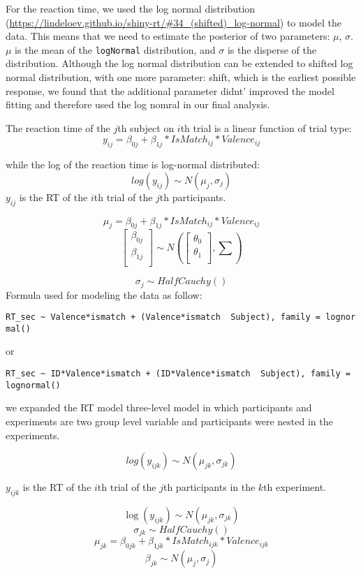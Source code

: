 \documentclass[
  man]{apa6}
\begin{document}
For the reaction time, we used the log normal distribution (\url{https://lindeloev.github.io/shiny-rt/\#34_(shifted)_log-normal}) to model the data. This means that we need to estimate the posterior of two parameters: \(\mu\), \(\sigma\). \(\mu\) is the mean of the \texttt{logNormal} distribution, and \(\sigma\) is the disperse of the distribution. Although the log normal distribution can be extended to shifted log normal distribution, with one more parameter: shift, which is the earliest possible response, we found that the additional parameter didnt' improved the model fitting and therefore used the log nomral in our final analysis.

The reaction time of the \(j\)th subject on \(i\)th trial is a linear function of trial type: \[y_{ij} = \beta_{0j} + \beta_{1j}*IsMatch_{ij} * Valence_{ij}\]

while the log of the reaction time is log-normal distributed:
\[ log(y_{ij}) \sim N(\mu_{j}, \sigma_{j})\]
\(y_{ij}\) is the RT of the \(i\)th trial of the \(j\)th participants.

\[\mu_{j} = \beta_{0j} + \beta_{1j}*IsMatch_{ij} * Valence_{ij}\]
\[ \begin{bmatrix}\beta_{0j}\\
\beta_{1j}\\
\end{bmatrix} \sim N(\begin{bmatrix}\theta_{0}\\
\theta_{1}\\
\end{bmatrix}, \sum) \]

\[\sigma_{j} \sim HalfCauchy()\]
Formula used for modeling the data as follow:

\texttt{RT\_sec\ \textasciitilde{}\ Valence*ismatch\ +\ (Valence*ismatch\ \textbar{}\ Subject),\ family\ =\ lognormal()}

or

\texttt{RT\_sec\ \textasciitilde{}\ ID*Valence*ismatch\ +\ (ID*Valence*ismatch\ \textbar{}\ Subject),\ family\ =\ lognormal()}

we expanded the RT model three-level model in which participants and experiments are two group level variable and participants were nested in the experiments.

\[ log(y_{ijk}) \sim N(\mu_{jk}, \sigma_{jk})\]

\(y_{ijk}\) is the RT of the \(i\)th trial of the \(j\)th participants in the \(k\)th experiment.

\[\log(y_{ijk}) \sim N(\mu_{jk}, \sigma_{jk})\]
\[\sigma_{jk} \sim HalfCauchy()\]
\[\mu_{jk} = \beta_{0jk} + \beta_{1jk}*IsMatch_{ijk} * Valence_{ijk} \]
\[\beta_{jk} \sim N(\mu_{j}, \sigma_j)\]
\end{document}
